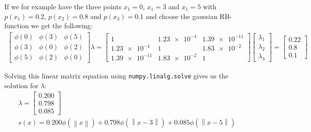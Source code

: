 If we for example have the three points $x_1=0$, $x_1=3$ and $x_1=5$ with $p(x_1)=0.2$, $p(x_2)=0.8$ and $p(x_3)=0.1$ and choose the gaussian RB-function we get the following:
\begin{align}
	\begin{bmatrix}
		\phi(0) & \phi(3)  & \phi(5) \\
		\phi(3) & \phi(0) & \phi(2) \\
		\phi(5) & \phi(2)  & \phi(0)
	\end{bmatrix} 
	\lambda
	=
		\begin{bmatrix}
			1              & \num{1.23e-4} & \num{1.39e-11} \\
			\num{1.23e-4}  & 1             & \num{1.83e-2}  \\
			\num{1.39e-11} & \num{1.83e-2} & 1
		\end{bmatrix} 
	\begin{bmatrix}
\lambda_1 \\
\lambda_2 \\
\lambda_3
\end{bmatrix}
=
\begin{bmatrix}
0.22\\0.8\\0.1
\end{bmatrix}
\end{align}

Solving this linear matrix equation using \texttt{numpy.linalg.solve} gives us the solution for $\lambda$:
\begin{gather}
	\lambda=\begin{bmatrix}
	0.200 \\0.798  \\0.085
	\end{bmatrix}
	\\
	s(x)=0.200\phi(\left\|x\right\|)+
		0.798\phi(\left\|x-3\right\|)+
		0.085\phi(\left\|x-5\right\|)
\end{gather}



